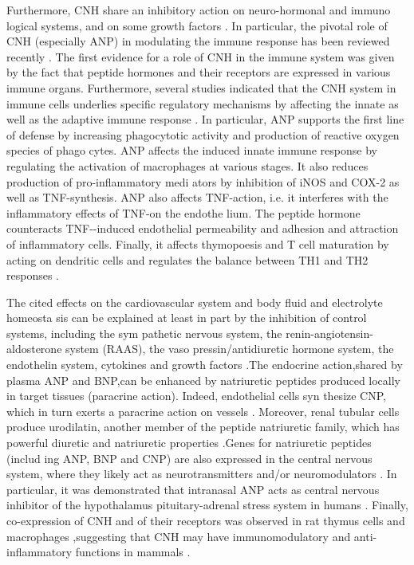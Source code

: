 \documentclass[14pt,a4paper,onecolumn]{extarticle}
\begin{document}
Furthermore, CNH share an inhibitory action on neuro-hormonal and immuno logical systems, and on some growth factors \citep{13} \citep{28} \citep{30} \citep{77} \citep{78} \citep{90} \citep{91} \citep{92} \citep{93} \citep{94} \citep{95} \citep{96} \citep{97} \citep{98} \citep{99}. In particular, the pivotal role of CNH (especially ANP) in modulating the immune response has been reviewed recently \citep{98}. The first evidence for a role of CNH in the immune system was given by the fact that peptide hormones and their receptors are expressed in various immune organs. Furthermore, several studies indicated that the CNH system in immune cells underlies specific regulatory mechanisms by affecting the innate as well as the adaptive immune response \citep{99}. In particular, ANP supports the first line of defense by increasing phagocytotic activity and production of reactive oxygen species of phago cytes. ANP affects the induced innate immune response by regulating the activation of macrophages at various stages. It also reduces production of pro-inflammatory medi ators by inhibition of iNOS and COX-2 as well as TNF-\alpha synthesis. ANP also affects TNF-\alpha action, i.e. it interferes with the inflammatory effects of TNF-\alpha on the endothe lium. The peptide hormone counteracts TNF-\alpha-induced endothelial permeability and adhesion and attraction of inflammatory cells. Finally, it affects thymopoesis and T cell maturation by acting on dendritic cells and regulates the balance between TH1 and TH2 responses \citep{99}.

The cited effects on the cardiovascular system and body fluid and electrolyte homeosta sis can be explained at least in part by the inhibition of control systems, including the sym pathetic nervous system, the renin-angiotensin-aldosterone system (RAAS), the vaso pressin/antidiuretic hormone system, the endothelin system, cytokines and growth factors \citep{90} \citep{91} \citep{92} \citep{93} \citep{94} \citep{95} \citep{96} \citep{97} \citep{98} \citep{99}.The endocrine action,shared by plasma ANP and BNP,can be enhanced by natriuretic peptides produced locally in target tissues (paracrine action). Indeed, endothelial cells syn thesize CNP, which in turn exerts a paracrine action on vessels \citep{57} \citep{84} \citep{85} \citep{86} \citep{87} \citep{88}. Moreover, renal tubular cells produce urodilatin, another member of the peptide natriuretic family, which has powerful diuretic and natriuretic properties \citep{100}.Genes for natriuretic peptides (includ ing ANP, BNP and CNP) are also expressed in the central nervous system, where they likely act as neurotransmitters and/or neuromodulators \citep{91} \citep{92} \citep{93} \citep{100} \citep{101} \citep{102}. In particular, it was demonstrated that intranasal ANP acts as central nervous inhibitor of the hypothalamus pituitary-adrenal stress system in humans \citep{103}. Finally, co-expression of CNH and of their receptors was observed in rat thymus cells and macrophages \citep{104} \citep{105},suggesting that CNH may have immunomodulatory and anti-inflammatory functions in mammals \citep{106}.
\end{document}
